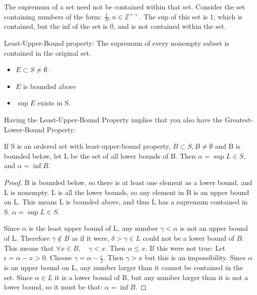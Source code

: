 \documentclass[12pt, letterpaper]{paper}
\begin{document}
\vspace{ .33in }

The supremum of a set need not be contained within that set. Consider
the set containing numbers of the form:
$\frac{1}{N}, n \in \mathbb{Z^{++}}$. The sup of this set is 1, which
is contained, but the inf of the set is 0, and is not contained within
the set.

\vspace{ .33in }

Least-Upper-Bound property: The supremum of every nonempty subset is
contained in the original set.
\begin{itemize}
\item $E \subset S \neq \emptyset$.
\item $E$ is bounded above
\item $\sup{E}$ exists in S.
\end{itemize}

Having the Least-Upper-Bound Property implies that you also have the
Greatest-Lower-Bound Property:

\begin{theorem}
  \label{thr:1.11}
  If S is an ordered set with least-upper-bound property,
  $B \subset S, B \neq \emptyset$ and B is bounded below, let L be the
  set of all lower bounds of B. Then $\alpha = \sup{L} \in S$, and
  $\alpha = \inf{B}$.
\end{theorem}
\begin{proof}
  B is bounded below, so there is at least one element as a lower
  bound, and L is nonempty. L is all the lower bounds, so any element
  in B is an upper bound on L. This means L is bounded above, and thus
  L has a supremum contained in S. $\alpha = \sup{L} \in S$.

  Since $\alpha$ is the least upper bound of L, any number
  $\gamma < \alpha$ is not an upper bound of L. Therefore
  $\gamma \notin B$ as if it were, $\delta > \gamma \in L$ could not
  be a lower bound of $B$. This means that
  $\forall x \in B, \quad \gamma < x$. Then $\alpha \leq x$. If this
  were not true: Let $\epsilon = \alpha - x > 0$. Choose
  $\gamma = \alpha - \frac{\epsilon}{2}$. Then $\gamma > x$ but this
  is an impossibility.  Since $\alpha$ is an upper bound on L, any
  number larger than it cannot be contained in the set. Since
  $\alpha \in L$ it is a lower bound of B, but any number larger than
  it is not a lower bound, so it must be that: $\alpha = \inf{B}$.
\end{proof}
\end{document}
